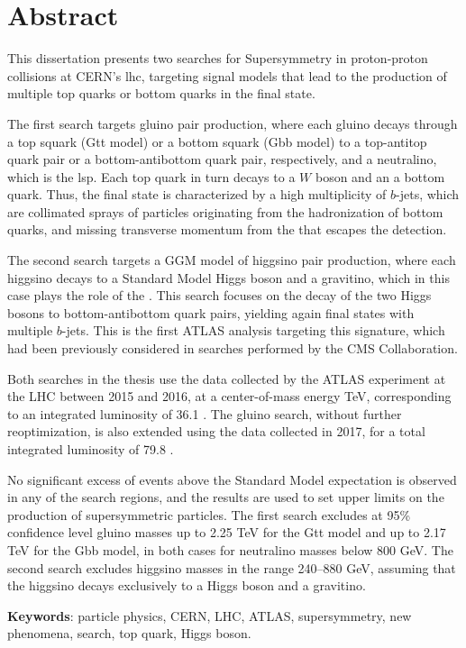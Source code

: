 \chapter*{Abstract}

This dissertation presents two searches for Supersymmetry in proton-proton collisions at CERN's \gls{lhc}, 
targeting signal models that lead to the production of multiple top quarks or bottom quarks in the final state.

The first search targets gluino pair production, where each gluino decays through a top squark (Gtt model) or a bottom squark (Gbb model) 
to a top-antitop quark pair or a bottom-antibottom quark pair, respectively, and a neutralino, which is the \gls{lsp}. 
Each top quark in turn decays to a $W$ boson and an a bottom quark.
Thus, the final state is characterized by a high multiplicity of $b$-jets, which are collimated sprays of particles originating from the hadronization of bottom quarks, and 
missing transverse momentum from the  that escapes the detection. 

The second search targets a GGM model of higgsino pair production, 
where each higgsino decays to a Standard Model Higgs boson and 
a gravitino, which in this case plays the role of the . 
This search focuses on the decay of the two Higgs bosons to bottom-antibottom quark pairs, yielding again final states with multiple $b$-jets.
This is the first ATLAS analysis targeting this signature, which had been 
previously considered in searches performed by the CMS Collaboration.

Both searches in the thesis use the data collected by the ATLAS experiment at the LHC 
between 2015 and 2016, at a center-of-mass energy  \cmtre TeV,
corresponding to an integrated luminosity of 36.1 \ifb.
The gluino search, without further reoptimization, is also extended using the data collected in 2017, for a total integrated luminosity of 79.8 \ifb.

No significant excess of events above the Standard Model expectation is observed in any of the search regions, 
and the results are used to set upper limits on the production of supersymmetric particles. 
The first search excludes at 95\% confidence level gluino masses up to 2.25 TeV for the Gtt model 
and up to 2.17 TeV for the Gbb model, in both cases for neutralino masses below 800 GeV.
The second search excludes higgsino masses in the range 240--880 GeV, assuming 
that the higgsino decays exclusively to a Higgs boson and a gravitino. 

\par\bigskip
\par\bigskip 
\par\bigskip

\noindent \textbf{Keywords}: particle physics, CERN, LHC, ATLAS, supersymmetry, new phenomena, search, top quark, Higgs boson. 
